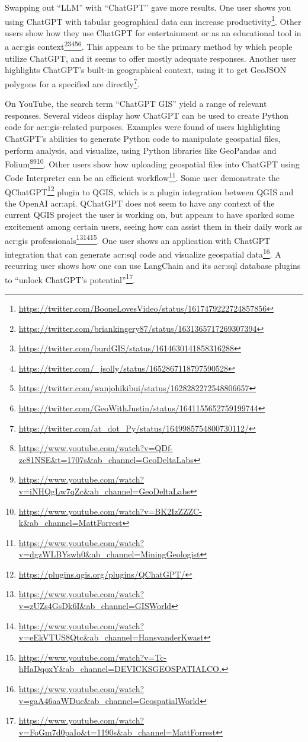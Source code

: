 Swapping out \enquote{LLM} with \enquote{ChatGPT} gave more results. One user shows you using ChatGPT with tabular geographical data can increase productivity\footnote{\url{https://twitter.com/BooneLovesVideo/status/1617479222724857856}}. Other users show how they use ChatGPT for entertainment  or as an educational tool in a \acrshort{acr:gis} context\footnote{\url{https://twitter.com/briankingery87/status/1631365717269307394}}\footnote{\url{https://twitter.com/burdGIS/status/1614630141858316288}}\footnote{\url{https://twitter.com/_jsolly/status/1652867118797590528}}\footnote{\url{https://twitter.com/wanjohikibui/status/1628282272548806657}}\footnote{\url{https://twitter.com/GeoWithJustin/status/1641155652759199744}}. This appears to be the primary method by which people utilize ChatGPT, and it seems to offer mostly adequate responses. Another user highlights ChatGPT's built-in geographical context, using it to get GeoJSON polygons for a specified are directly\footnote{\url{https://twitter.com/at_dot_Py/status/1649985754800730112/}}.

On YouTube, the search term \enquote{ChatGPT GIS} yield a range of relevant responses. Several videos display how ChatGPT can be used to create Python code for \acrshort{acr:gis}-related purposes. Examples were found of users highlighting ChatGPT's abilities to generate Python code to manipulate geospatial files, perform analysis, and visualize, using Python libraries like GeoPandas and Folium\footnote{\url{https://www.youtube.com/watch?v=QDf-zc81NSE&t=1707s&ab_channel=GeoDeltaLabs}}\footnote{\url{https://www.youtube.com/watch?v=iNHQgLw7qZc&ab_channel=GeoDeltaLabs}}\footnote{\url{https://www.youtube.com/watch?v=BK2IzZZZC-k&ab_channel=MattForrest}}. Other users show how uploading geospatial files into ChatGPT using Code Interpreter can be an efficient workflow\footnote{\url{https://www.youtube.com/watch?v=dgzWLBYswh0&ab_channel=MiningGeologist}}. Some user demonstrate the QChatGPT\footnote{\url{https://plugins.qgis.org/plugins/QChatGPT/}} plugin to QGIS, which is a plugin integration between QGIS and the OpenAI \acrshort{acr:api}. QChatGPT does not seem to have any context of the current QGIS project the user is working on, but appears to have sparked some excitement among certain users, seeing how  can assist them in their daily work as \acrshort{acr:gis} professionals\footnote{\url{https://www.youtube.com/watch?v=zUZs4GsDk6I&ab_channel=GISWorld}}\footnote{\url{https://www.youtube.com/watch?v=eEkVTUS8Qtc&ab_channel=HansvanderKwast}}\footnote{\url{https://www.youtube.com/watch?v=Tc-hHaDqoxY&ab_channel=DEVICKSGEOSPATIALCO.}}. One user shows an application with ChatGPT integration that can generate \acrshort{acr:sql} code and visualize geospatial data\footnote{\url{https://www.youtube.com/watch?v=gaA46aaWDuc&ab_channel=GeospatialWorld}}. A recurring user shows how one can use LangChain and its \acrshort{acr:sql} database plugins to \enquote{unlock ChatGPT's potential}\footnote{\url{https://www.youtube.com/watch?v=FoGm7d0paIo&t=1190s&ab_channel=MattForrest}}.

